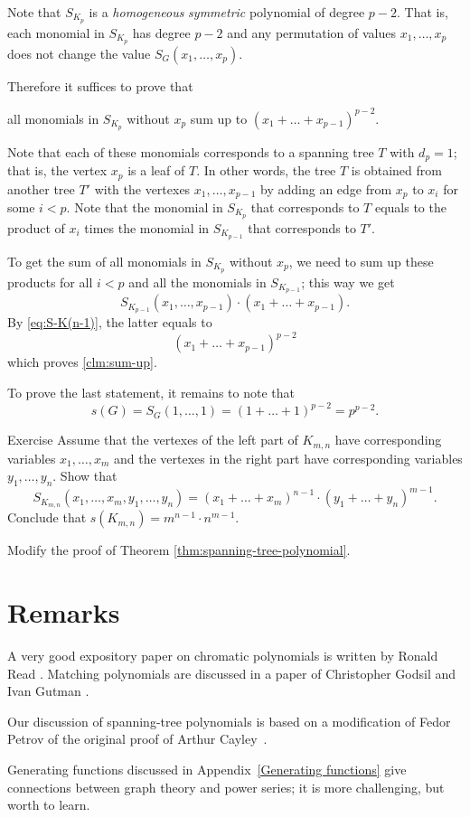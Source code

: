 Note that $S_{K_p}$ is a {}\emph{homogeneous} {}\emph{symmetric} polynomial of degree $p-2$.
That is, each monomial in $S_{K_{p}}$ has degree $p-2$ and any permutation of values $x_1,\dots, x_p$ does not change the value $S_G(x_1,\dots,x_p)$.

Therefore it suffices to prove that 
\begin{clm}{}\label{clm:sum-up}
all monomials in $S_{K_p}$ without $x_p$ sum up to $(x_1+\dots+x_{p-1})^{p-2}$. 
\end{clm}

Note that each of these monomials corresponds to a spanning tree $T$ with $d_p=1$;
that is, the vertex $x_p$ is a leaf of $T$.
In other words, the tree $T$ is obtained from another tree $T'$ with the vertexes $x_1,\dots,x_{p-1}$ 
by adding an edge from $x_p$ to $x_i$ for some $i<p$.
Note that the monomial in $S_{K_p}$ that corresponds to $T$ equals 
to the product of $x_i$ times the monomial in $S_{K_{p-1}}$
that corresponds to $T'$.

To get the sum of all monomials in $S_{K_p}$ without $x_p$, we need to sum up these products for all $i<p$ and all the monomials in $S_{K_{p-1}}$; this way we get 
\[S_{K_{p-1}}(x_1,\dots,x_{p-1})\cdot(x_1+\dots+x_{p-1}).\]
By \ref{eq:S-K(n-1)}, the latter equals to
\[(x_1+\dots+x_{p-1})^{p-2}\]
which proves \ref{clm:sum-up}.

To prove the last statement, it remains to note that 
\[s(G)=S_G(1,\dots,1)=(1+\dots+1)^{p-2}=p^{p-2}.\]
\qedsf

\begin{thm}{Exercise}
Assume that the vertexes of the left part of $K_{m,n}$ have corresponding variables $x_1,\dots,x_m$ and the vertexes in the right part have corresponding variables $y_1,\dots,y_n$. 
Show that
\[S_{K_{m,n}}(x_1,\dots,x_m,y_1,\dots,y_n)=(x_1+\dots +x_m)^{n-1}\cdot(y_1+\dots +y_n)^{m-1}.\]
Conclude that $s(K_{m,n})=m^{n-1}\cdot n^{m-1}$.

\end{thm}

 Modify the proof of Theorem \ref{thm:spanning-tree-polynomial}.

\section*{Remarks}

A very good expository paper on chromatic polynomials is written by
Ronald Read \cite[see][]{read}. 
Matching polynomials are discussed in a paper of Christopher Godsil and Ivan Gutman \cite[see][]{godsil-gutman}.

Our discussion of spanning-tree polynomials is based on a modification of Fedor Petrov \cite{petrov} of the original proof of Arthur Cayley~\cite{cayley}. 

Generating functions discussed in Appendix~\ref{Generating functions} give connections between graph theory and power series; it is more challenging, but worth to learn.   
